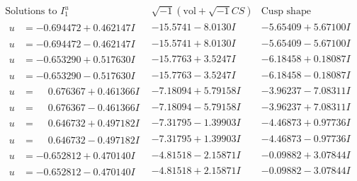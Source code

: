 \documentclass[1p]{elsarticle_modified}
\theoremstyle{definition}
\newcommand{\I}{\sqrt{-1}}
\begin{document}
$$\begin{array}{c|c|c}  
\text{Solutions to }I^u_{1}& \I (\text{vol} + \sqrt{-1}CS) & \text{Cusp shape}\\
 \hline 
\begin{aligned}
u &= -0.694472 + 0.462147 I\end{aligned}
 & -15.5741 - 8.0130 I & -5.65409 + 5.67100 I \\ \hline\begin{aligned}
u &= -0.694472 - 0.462147 I\end{aligned}
 & -15.5741 + 8.0130 I & -5.65409 - 5.67100 I \\ \hline\begin{aligned}
u &= -0.653290 + 0.517630 I\end{aligned}
 & -15.7763 + 3.5247 I & -6.18458 + 0.18087 I \\ \hline\begin{aligned}
u &= -0.653290 - 0.517630 I\end{aligned}
 & -15.7763 - 3.5247 I & -6.18458 - 0.18087 I \\ \hline\begin{aligned}
u &= \phantom{-}0.676367 + 0.461366 I\end{aligned}
 & -7.18094 + 5.79158 I & -3.96237 - 7.08311 I \\ \hline\begin{aligned}
u &= \phantom{-}0.676367 - 0.461366 I\end{aligned}
 & -7.18094 - 5.79158 I & -3.96237 + 7.08311 I \\ \hline\begin{aligned}
u &= \phantom{-}0.646732 + 0.497182 I\end{aligned}
 & -7.31795 - 1.39903 I & -4.46873 + 0.97736 I \\ \hline\begin{aligned}
u &= \phantom{-}0.646732 - 0.497182 I\end{aligned}
 & -7.31795 + 1.39903 I & -4.46873 - 0.97736 I \\ \hline\begin{aligned}
u &= -0.652812 + 0.470140 I\end{aligned}
 & -4.81518 - 2.15871 I & -0.09882 + 3.07844 I \\ \hline\begin{aligned}
u &= -0.652812 - 0.470140 I\end{aligned}
 & -4.81518 + 2.15871 I & -0.09882 - 3.07844 I \\ \hline\begin{aligned}

\end{aligned}
\end{array}$$
\end{document}
